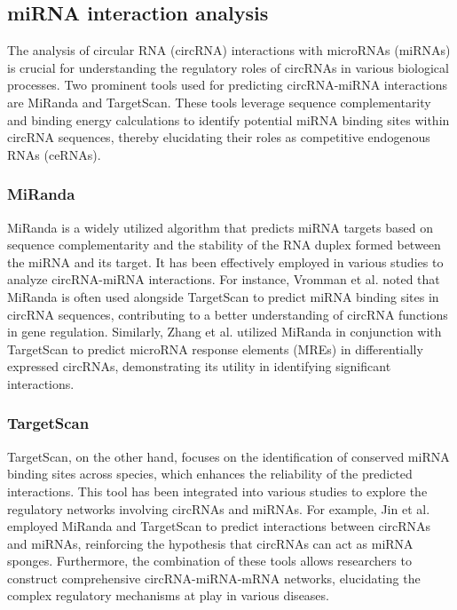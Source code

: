 \subsection{miRNA interaction analysis}
The analysis of circular RNA (circRNA) interactions with microRNAs (miRNAs) is
crucial for understanding the regulatory roles of circRNAs in various biological
processes. Two prominent tools used for predicting circRNA-miRNA interactions
are MiRanda and TargetScan. These tools leverage sequence complementarity and
binding energy calculations to identify potential miRNA binding sites within
circRNA sequences, thereby elucidating their roles as competitive endogenous
RNAs (ceRNAs).

\subsubsection{MiRanda}
MiRanda is a widely utilized algorithm that predicts miRNA targets based on
sequence complementarity and the stability of the RNA duplex formed between the
miRNA and its target. It has been effectively employed in various studies to
analyze circRNA-miRNA interactions. For instance, Vromman et al. noted that
MiRanda is often used alongside TargetScan to predict miRNA binding sites in
circRNA sequences, contributing to a better understanding of circRNA functions
in gene regulation\supercite{vromman_closing_2021}. Similarly, Zhang et al. utilized
MiRanda in conjunction with TargetScan to predict microRNA response elements
(MREs) in differentially expressed circRNAs, demonstrating its utility in
identifying significant interactions\supercite{zhang_microarray_2017}.

\subsubsection{TargetScan}
TargetScan, on the other hand, focuses on the identification of conserved miRNA
binding sites across species, which enhances the reliability of the predicted
interactions. This tool has been integrated into various studies to explore the
regulatory networks involving circRNAs and miRNAs. For example, Jin et al.
employed MiRanda and TargetScan to predict interactions between circRNAs and
miRNAs, reinforcing the hypothesis that circRNAs can act as miRNA
sponges\supercite{jin_changes_2018}. Furthermore, the combination of these tools
allows researchers to construct comprehensive circRNA-miRNA-mRNA networks,
elucidating the complex regulatory mechanisms at play in various
diseases\supercite{he_construction_2021,zhang_construction_2021}.


